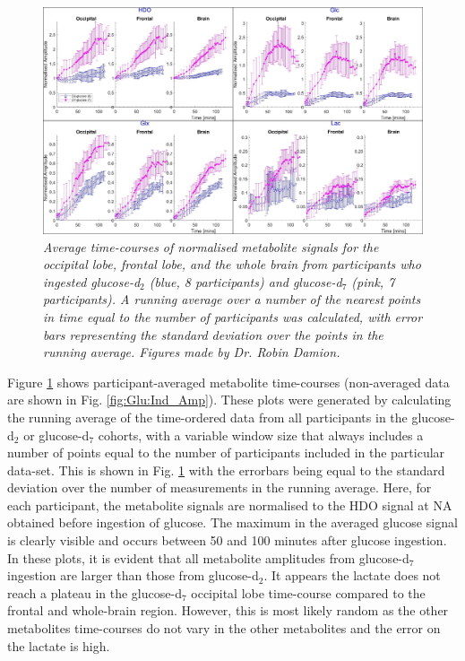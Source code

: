 \begin{figure}
    \centering
    \includegraphics[width = 1\textwidth]{Figures/Glucose/Avg_Amp.png}
    \caption{\textit{Average time-courses of normalised metabolite signals for the occipital lobe, frontal lobe, and the whole brain from participants who ingested glucose-d$_2$ (blue, 8 participants) and glucose-d$_7$ (pink, 7 participants). A running average over a number of the nearest points in time equal to the number of participants was calculated, with error bars representing the standard deviation over the points in the running average. Figures made by Dr. Robin Damion.}}
    \label{fig:Glu:Avg_Amp}
\end{figure}

Figure \ref{fig:Glu:Avg_Amp} shows participant-averaged metabolite time-courses (non-averaged data are shown in Fig. \ref{fig:Glu:Ind_Amp}). These plots were generated by calculating the running average of the time-ordered data from all participants in the glucose-d$_2$ or glucose-d$_7$ cohorts, with a variable window size that always includes a number of points equal to the number of participants included in the particular data-set. This is shown in Fig. \ref{fig:Glu:Avg_Amp} with the errorbars being equal to the standard deviation over the number of measurements in the running average. Here, for each participant, the metabolite signals are normalised to the \ac{HDO} signal at \ac{NA} obtained before ingestion of glucose. The maximum in the averaged glucose signal is clearly visible and occurs between 50 and 100 minutes after glucose ingestion. In these plots, it is evident that all metabolite amplitudes from glucose-d$_7$ ingestion are larger than those from glucose-d$_2$. It appears the lactate does not reach a plateau in the glucose-d$_7$ occipital lobe time-course compared to the frontal and whole-brain region. However, this is most likely random as the other metabolites time-courses do not vary in the other metabolites and the error on the lactate is high.


